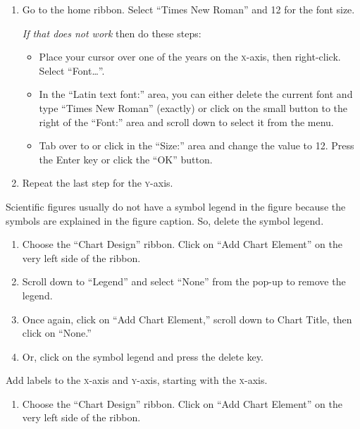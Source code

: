 \documentclass[12pt, hidelinks]{exam}
\newcommand*\axis[1]{{\scshape #1}-axis}
\begin{document}
\begin{questions}
\begin{enumerate}[resume]
	\item Go to the home ribbon. Select “Times New Roman” and 12 for the font size.
	
	\emph{If that does not work} then do these steps:
	
	\begin{itemize}
		\item Place your cursor over one of the years on the \axis{x}, then right-click. Select “Font\dots”.

		\item In the “Latin text font:” area, you can either delete the current font and type “Times New Roman” (exactly) or click on the small button to the right of the “Font:” area and scroll down to select it from the menu. 

		\item Tab over to or click in the “Size:” area and change the value to 12. Press the Enter key or click the “OK” button.

	\end{itemize}
	
	\item Repeat the last step for the \axis{y}.
	
\end{enumerate}

Scientific figures usually do not have a symbol legend in the figure because the symbols are explained in the figure caption. So, delete the symbol legend.  

\begin{enumerate}[resume]
	\item Choose the “Chart Design” ribbon. Click on “Add Chart Element” on the very left side of the ribbon.  

	\item Scroll down to “Legend” and select “None” from the pop-up to remove the legend.

	\item Once again, click on “Add Chart Element,” scroll down to Chart Title, then click on “None.”

	\item Or, click on the symbol legend and press the delete key. 
\end{enumerate}

Add labels to the \axis{x} and \axis{y}, starting with the \axis{x}.

\begin{enumerate}[resume]
	\item Choose the “Chart Design” ribbon. Click on “Add Chart Element” on the very left side of the ribbon.
	

\end{enumerate}
\end{questions}
\end{document}
